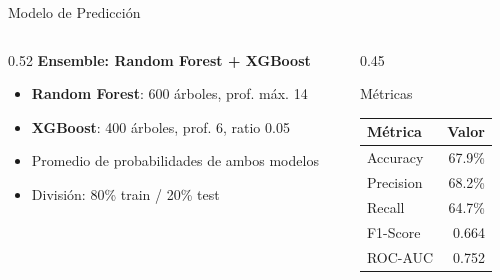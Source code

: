 \documentclass[aspectratio=169,11pt]{beamer}
\begin{document}
\begin{frame}{Modelo de Predicci\'on}
\begin{columns}[T]
\begin{column}{0.52\textwidth}
\textbf{\color{acento} Ensemble: Random Forest + XGBoost}

\vspace{6pt}
\begin{itemize}
  \item \textbf{Random Forest}: 600 \'arboles, prof. m\'ax. 14
  \item \textbf{XGBoost}: 400 \'arboles, prof. 6, ratio 0.05
  \item Promedio de probabilidades de ambos modelos
  \item Divisi\'on: 80\% train / 20\% test
\end{itemize}
\end{column}

\begin{column}{0.45\textwidth}
\begin{block}{M\'etricas}
\begin{tabular}{lr}
\toprule
\textbf{M\'etrica} & \textbf{Valor} \\
\midrule
Accuracy    & 67.9\%  \\
Precision   & 68.2\%  \\
Recall      & 64.7\%  \\
F1-Score    & 0.664   \\
ROC-AUC     & 0.752   \\
\bottomrule
\end{tabular}
\end{block}
\end{column}
\end{columns}
\end{frame}
\end{document}
